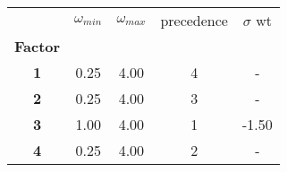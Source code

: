 \begin{tabular}{ccccc}
    \toprule
    {}              & $\omega_{min}$ & $\omega_{max}$ & precedence & $\sigma$ wt \\
    \textbf{Factor} &                &                &            &             \\
    \midrule
    \textbf{1     } & 0.25           & 4.00           & 4          & -           \\
    \textbf{2     } & 0.25           & 4.00           & 3          & -           \\
    \textbf{3     } & 1.00           & 4.00           & 1          & -1.50       \\
    \textbf{4     } & 0.25           & 4.00           & 2          & -           \\
    \bottomrule
\end{tabular}
